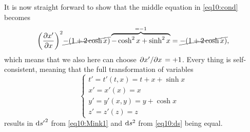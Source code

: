 \documentclass[11pt,a4paper, 
swedish, english %
]{article}
\begin{document}
It is now straight forward to show that the middle equation in
\eqref{eq10:cond} becomes
\begin{equation}
\qty(\pdv{x'}{x})^2
\cancel{-(1+2\cosh x)}
\overbrace{-\cosh^2 x+\sinh^2x}^{=-1}
=\cancel{-(1+2\cosh x)},
\end{equation}
which means that we also here can choose $\pdv*{x'}{x}=+1$. Every
thing is self-consistent, meaning that the full transformation of
variables 
\begin{equation}
\begin{cases}
t'=t'(t,x)=t+x+\sinh x\\
x'=x'(x)=x\\
y'=y'(x,y)=y+\cosh x\\
z'=z'(z)=z
\end{cases}
\end{equation}
results in $\mathrm{d}{s'}^2$ from \eqref{eq10:Mink1} and $\mathrm{d}{s}^2$ from
\eqref{eq10:ds} being equal.
\end{document}
